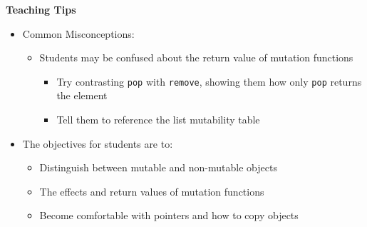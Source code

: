 \begin{guide}
	\textbf{Teaching Tips}
	\begin{itemize}
			\item Common Misconceptions:
			\begin{itemize}
				\item Students may be confused about the return value of mutation functions
				\begin{itemize}
					\item Try contrasting \lstinline{pop} with \lstinline{remove}, showing them how only \lstinline{pop} returns the element
					\item Tell them to reference the list mutability table
				\end{itemize}
			\end{itemize}
			\item The objectives for students are to:
			\begin{itemize}
				\item Distinguish between mutable and non-mutable objects
				\item The effects and return values of mutation functions
				\item Become comfortable with pointers and how to copy objects
			\end{itemize}
	\end{itemize}
\end{guide}
